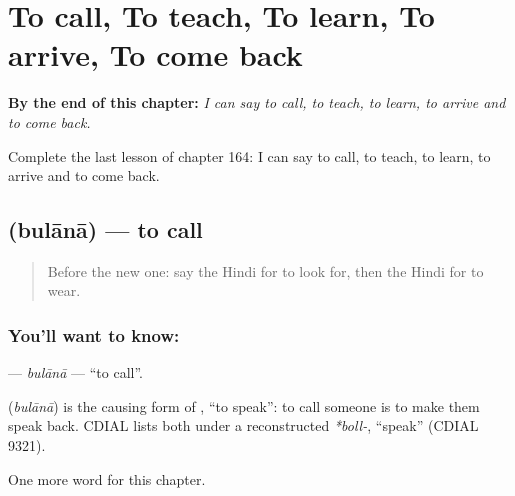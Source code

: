 
\chapter{To call, To teach, To learn, To arrive, To come back}
\label{ch:hi-to-call-to-teach-to-learn-to-arrive-to-come-back}

\begin{chapteropening}
\textbf{By the end of this chapter:} \emph{I can say to call, to teach, to learn, to arrive and to come back.}

Complete the last lesson of chapter 164: I can say to call, to teach, to learn, to arrive and to come back.
\end{chapteropening}

\section[\texorpdfstring{\hi{बुलाना} (bulānā)}{बुलाना (bulānā)}]{ (bulānā) — to call}

\label{lesson:HI-C164-bulana}



\begin{quote}
Before the new one: say the Hindi for to look for, then the Hindi for to wear.
\end{quote}

\subsection*{You'll want to know: }
\textbf{} — \emph{bulānā} — \textquotedblleft{}to call\textquotedblright{}.

\begin{cousinweb}
\textbf{} (\emph{bulānā}) is the causing form of \textbf{}, \textquotedblleft{}to speak\textquotedblright{}: to call someone is to make them speak back. CDIAL lists both under a reconstructed \emph{*boll-}, \textquotedblleft{}speak\textquotedblright{} (CDIAL 9321).
\end{cousinweb}

\begin{grammarlens}[title={What you've built}]
One more word for this chapter.
\end{grammarlens}

